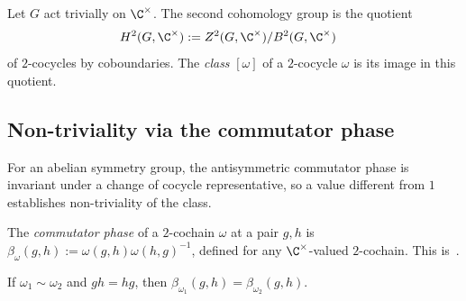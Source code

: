 \begin{definition}\label{def:h2_cx}
    \mathlibok %
    Let $G$ act trivially on $\C^{\times}$. The second cohomology group
    is the quotient
    \begin{align}
        H^2(G,\C^{\times})
         & :=Z^2(G,\C^{\times})/B^2(G,\C^{\times})
        \label{eq:symmetry_h2_quotient}
    \end{align}
    of $2$-cocycles by coboundaries. The \emph{class} $[\omega]$ of a
    $2$-cocycle $\omega$ is its image in this quotient.
\end{definition}

\subsection{Non-triviality via the commutator phase}

For an abelian symmetry group, the antisymmetric commutator phase is invariant
under a change of cocycle representative, so a value different from $1$
establishes non-triviality of the class.

\begin{definition}\label{def:comm_phase}
    \leanok
    The \emph{commutator phase} of a $2$-cochain $\omega$ at a pair $g,h$ is
    $\beta_\omega(g,h):=\omega(g,h) \omega(h,g)^{-1}$, defined for any
    $\C^{\times}$-valued $2$-cochain.
    This is~\cite[``Commutator phase'']{QICLean2026Blueprint}.
\end{definition}

\begin{lemma}\label{thm:comm_phase_invariant}
    \leanok
    If $\omega_1\sim\omega_2$ and $gh=hg$, then
    $\beta_{\omega_1}(g,h)=\beta_{\omega_2}(g,h)$.
\end{lemma}

